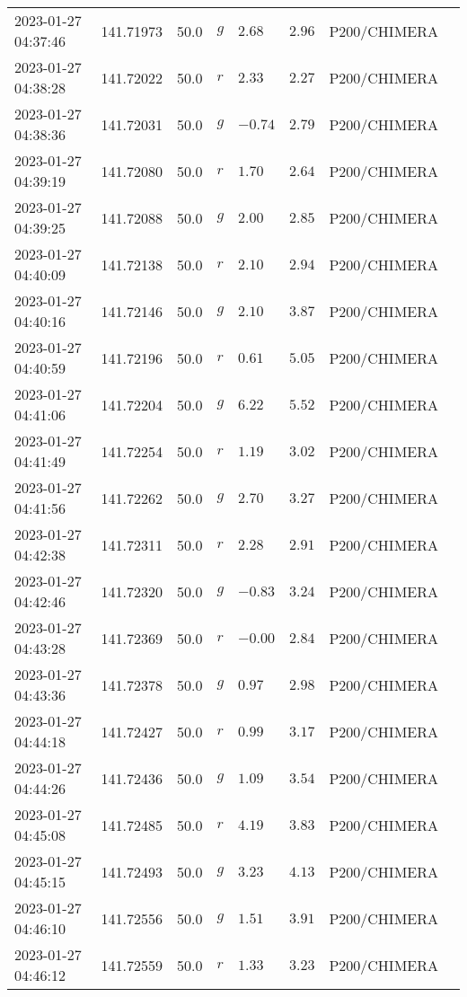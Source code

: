 \documentclass{nature_plusfigure}
\begin{document}
\begin{supplement}
\begin{center}
\begin{longtable}{llllllll}
2023-01-27 04:37:46 & 141.71973 & 50.0 & $g$ & $2.68$ & $2.96$ & P200/CHIMERA &  \\ 
2023-01-27 04:38:28 & 141.72022 & 50.0 & $r$ & $2.33$ & $2.27$ & P200/CHIMERA &  \\ 
2023-01-27 04:38:36 & 141.72031 & 50.0 & $g$ & $-0.74$ & $2.79$ & P200/CHIMERA &  \\ 
2023-01-27 04:39:19 & 141.72080 & 50.0 & $r$ & $1.70$ & $2.64$ & P200/CHIMERA &  \\ 
2023-01-27 04:39:25 & 141.72088 & 50.0 & $g$ & $2.00$ & $2.85$ & P200/CHIMERA &  \\ 
2023-01-27 04:40:09 & 141.72138 & 50.0 & $r$ & $2.10$ & $2.94$ & P200/CHIMERA &  \\ 
2023-01-27 04:40:16 & 141.72146 & 50.0 & $g$ & $2.10$ & $3.87$ & P200/CHIMERA &  \\ 
2023-01-27 04:40:59 & 141.72196 & 50.0 & $r$ & $0.61$ & $5.05$ & P200/CHIMERA &  \\ 
2023-01-27 04:41:06 & 141.72204 & 50.0 & $g$ & $6.22$ & $5.52$ & P200/CHIMERA &  \\ 
2023-01-27 04:41:49 & 141.72254 & 50.0 & $r$ & $1.19$ & $3.02$ & P200/CHIMERA &  \\ 
2023-01-27 04:41:56 & 141.72262 & 50.0 & $g$ & $2.70$ & $3.27$ & P200/CHIMERA &  \\ 
2023-01-27 04:42:38 & 141.72311 & 50.0 & $r$ & $2.28$ & $2.91$ & P200/CHIMERA &  \\ 
2023-01-27 04:42:46 & 141.72320 & 50.0 & $g$ & $-0.83$ & $3.24$ & P200/CHIMERA &  \\ 
2023-01-27 04:43:28 & 141.72369 & 50.0 & $r$ & $-0.00$ & $2.84$ & P200/CHIMERA &  \\ 
2023-01-27 04:43:36 & 141.72378 & 50.0 & $g$ & $0.97$ & $2.98$ & P200/CHIMERA &  \\ 
2023-01-27 04:44:18 & 141.72427 & 50.0 & $r$ & $0.99$ & $3.17$ & P200/CHIMERA &  \\ 
2023-01-27 04:44:26 & 141.72436 & 50.0 & $g$ & $1.09$ & $3.54$ & P200/CHIMERA &  \\ 
2023-01-27 04:45:08 & 141.72485 & 50.0 & $r$ & $4.19$ & $3.83$ & P200/CHIMERA &  \\ 
2023-01-27 04:45:15 & 141.72493 & 50.0 & $g$ & $3.23$ & $4.13$ & P200/CHIMERA &  \\ 
2023-01-27 04:46:10 & 141.72556 & 50.0 & $g$ & $1.51$ & $3.91$ & P200/CHIMERA &  \\ 
2023-01-27 04:46:12 & 141.72559 & 50.0 & $r$ & $1.33$ & $3.23$ & P200/CHIMERA &  \\ 

\end{longtable}
\end{center}
\end{supplement}
\end{document}
